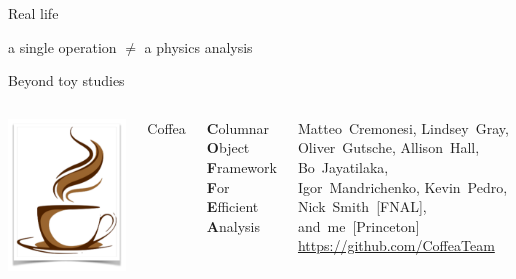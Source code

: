 \documentclass[aspectratio=169]{beamer}
\begin{document}
\begin{frame}{Real life}
\vspace{0.5 cm}
\LARGE
\begin{center}
a single operation $\ne$ a physics analysis
\end{center}
\end{frame}

\begin{frame}{Beyond toy studies}
\vspace{0.5 cm}
\begin{columns}
\includegraphics[width=\linewidth]{coffea-logo.png}

\hspace{-0.2 cm}\Huge Coffea

\vspace{0.25 cm}
\large {\bf C}olumnar {\bf O}bject {\bf F}ramework {\bf F}or {\bf E}fficient {\bf A}nalysis

\vspace{0.25 cm}
\normalsize Matteo~Cremonesi, Lindsey~Gray, Oliver~Gutsche, Allison~Hall, Bo~Jayatilaka, Igor~Mandrichenko, Kevin~Pedro, Nick~Smith~[FNAL], and~me~[Princeton] \hfill \textcolor{blue}{\url{https://github.com/CoffeaTeam}}
\end{columns}


\end{frame}
\end{document}
